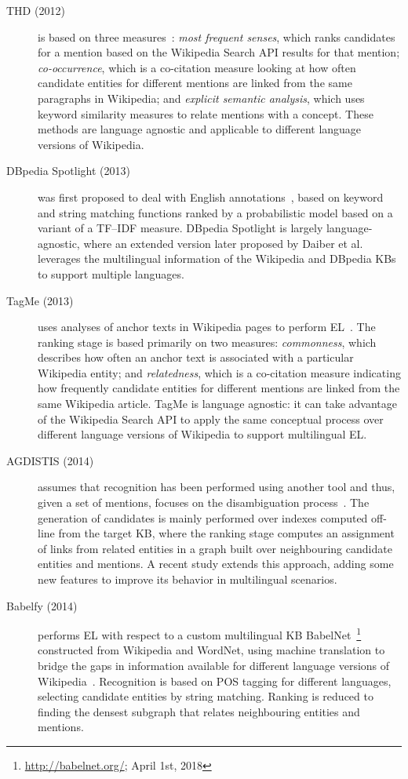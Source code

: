 \documentclass{llncs}
\begin{document}
\begin{description}
\item[THD (2012)] is based on three measures~\cite{THD-dojchinovski2012recognizing}: \textit{most frequent senses}, which ranks candidates for a mention based on the Wikipedia Search API results for that mention; \textit{co-occurrence}, which is a co-citation measure looking at how often candidate entities for different mentions are linked from the same paragraphs in Wikipedia; and \textit{explicit semantic analysis}, which uses keyword similarity measures to relate mentions with a concept. These methods are language agnostic and applicable to different language versions of Wikipedia.
\item[DBpedia Spotlight (2013)] was first proposed to deal with English annotations~\cite{mendes2011dbpedia}, based on keyword and string matching functions ranked by a probabilistic model based on a variant of a TF--IDF measure. DBpedia Spotlight is largely language-agnostic, where an extended version later proposed by Daiber et al.~\cite{daiber2013improving} leverages the multilingual information of the Wikipedia and DBpedia KBs to support multiple languages.
\item[TagMe (2013)] uses analyses of anchor texts in Wikipedia pages to perform EL~\cite{ferragina2010tagme}. The ranking stage is based primarily on two measures: \textit{commonness}, which describes how often an anchor text is associated with a particular Wikipedia entity; and \textit{relatedness}, which is a co-citation measure indicating how frequently candidate entities for different mentions are linked from the same Wikipedia article. TagMe is language agnostic: it can take advantage of the Wikipedia Search API to apply the same conceptual process over different language versions of Wikipedia to support multilingual EL.
\item[AGDISTIS (2014)] assumes that recognition has been performed using another tool and thus, given a set of mentions, focuses on the disambiguation process~\cite{usbeck2014agdistis}. The generation of candidates is mainly performed over indexes computed off-line from the target KB, where the ranking stage computes an assignment of links from related entities in a graph built over neighbouring candidate entities and mentions. A recent study \cite{mag2017} extends this approach, adding some new features to improve its behavior in multilingual scenarios. 
\item[Babelfy (2014)] performs EL with respect to a custom multilingual KB BabelNet~\footnote{\url{http://babelnet.org/}; April 1st, 2018} constructed from Wikipedia and WordNet, using machine translation to bridge the gaps in information available for different language versions of Wikipedia~\cite{Babelfy-moro2014entity}. Recognition is based on POS tagging for different languages, selecting candidate entities by string matching. Ranking is reduced to finding the densest subgraph that relates neighbouring entities and mentions.

\end{description}
\end{document}
